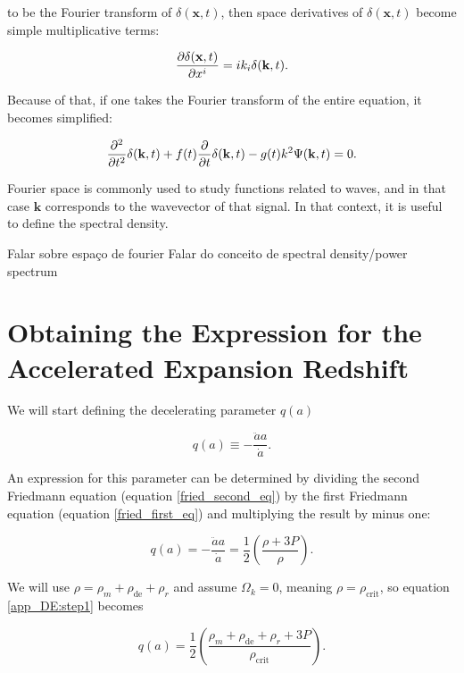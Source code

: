 \documentclass[openany,a4paper,12pt,oneside]{book}
\begin{document}
\begin{spacing}{1.5}
\noindent to be the Fourier transform of $\delta(\mathbf{x},t)$, then space derivatives of $\delta(\mathbf{x},t)$ become simple multiplicative terms:

\begin{equation}
	\pdv{\delta(\mathbf{x},t)}{x^i}=ik_i\delta(\mathbf{k},t).
\end{equation}

Because of that, if one takes the Fourier transform of the entire equation, it becomes simplified:

\begin{equation}\label{Four_Space:final_eq}
	\pdv[2]{}{t}\delta(\mathbf{k},t)+f(t)\pdv{}{t}\delta(\mathbf{k},t)-g(t)k^2\Psi(\mathbf{k},t)=0.
\end{equation}

Fourier space is commonly used to study functions related to waves, and in that case $\mathbf{k}$ corresponds to the wavevector of that signal. In that context, it is useful to define the spectral density.

Falar sobre espaço de fourier
Falar do conceito de spectral density/power spectrum
\fi

\chapter{Obtaining the Expression for the Accelerated Expansion Redshift}\label{app:dark_energy_era}

We will start defining the decelerating parameter $q(a)$

\begin{equation}\label{def:decelerating_parameter}
	q(a)\equiv -\frac{\ddot{a}a}{\dot{a}}.
\end{equation} 

An expression for this parameter can be determined by dividing the second Friedmann equation (equation \eqref{fried_second_eq}) by the first Friedmann equation (equation \eqref{fried_first_eq}) and multiplying the result by minus one:

\begin{equation}\label{app_DE:step1}
	q(a)=-\frac{\ddot{a}a}{\dot{a}}=\frac{1}{2}\left(\frac{\rho+3P}{\rho}\right).
\end{equation}

We will use $\rho=\rho_m+\rho_\text{de}+\rho_r$ and assume $\Omega_k=0$, meaning $\rho=\rho_\text{crit}$, so equation \eqref{app_DE:step1} becomes

\begin{equation}\label{app_DE:step2}
	q(a)=\frac{1}{2}\left(\frac{\rho_m+\rho_\text{de}+\rho_r+3P}{\rho_\text{crit}}\right).
\end{equation}


\end{spacing}
\end{document}
